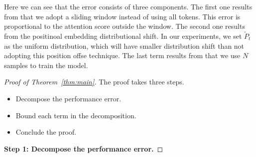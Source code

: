 Here we can see that the error consists of three components. The first one results from that we adopt a sliding window instead of using all tokens. This error is proportional to the attention score outside the window. The second one results from the positinoal embedding distributional shift. In our experiments, we set $\tilde{P}_{t}$ as the uniform distribution, which will have smaller distribution shift than not adopting this position offse technique. The last term results from that we use $N$ samples to train the model.
\begin{proof}[Proof of Theorem~\ref{thm:main}]
    The proof takes three steps.
    \begin{itemize}
        \item Decompose the performance error.
        \item Bound each term in the decomposition.
        \item Conclude the proof.
    \end{itemize}

    \textbf{Step 1: Decompose the performance error.}


\end{proof}
